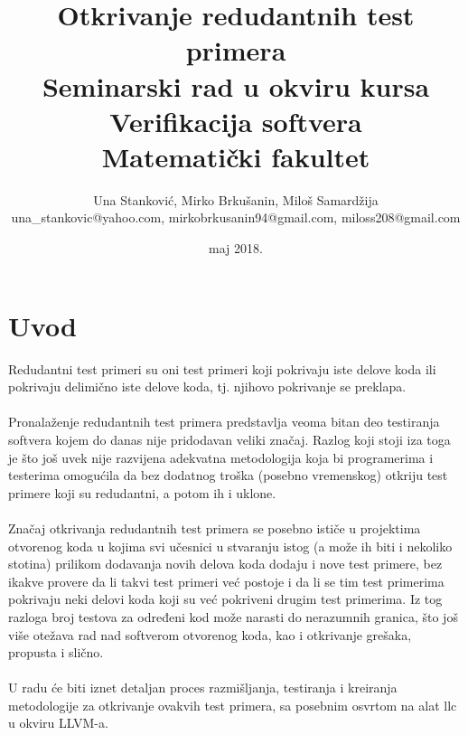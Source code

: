 \documentclass[a4paper]{article}
\begin{document}
\title{Otkrivanje redudantnih test primera\\ \small{Seminarski rad u okviru kursa\\Verifikacija softvera\\ Matematički fakultet}}

\author{Una Stanković, Mirko Brkušanin, Miloš Samardžija\\ una\_stankovic@yahoo.com, mirkobrkusanin94@gmail.com, miloss208@gmail.com}
\date{maj 2018.}
\maketitle


\tableofcontents
 
\newpage

\section{Uvod}
\label{sec:introduction}
Redudantni test primeri su oni test primeri koji pokrivaju iste delove koda ili pokrivaju delimično iste delove koda, tj. njihovo pokrivanje se preklapa.\\\\
Pronalaženje redudantnih test primera predstavlja veoma bitan deo testiranja softvera kojem do danas nije pridodavan veliki značaj. Razlog koji stoji iza toga je što još uvek nije razvijena adekvatna metodologija koja bi programerima i testerima omogućila da bez dodatnog troška (posebno vremenskog) otkriju test primere koji su redudantni, a potom ih i uklone.\\\\
Značaj otkrivanja redudantnih test primera se posebno ističe u projektima otvorenog koda u kojima svi učesnici u stvaranju istog (a može ih biti i nekoliko stotina) prilikom dodavanja novih delova koda dodaju i nove test primere, bez ikakve provere da li takvi test primeri već postoje i da li se tim test primerima pokrivaju neki delovi koda koji su već pokriveni drugim test primerima. Iz tog razloga broj testova za određeni kod može narasti do nerazumnih granica, što još više otežava rad nad softverom otvorenog koda, kao i otkrivanje grešaka, propusta i slično. \\\\
U radu će biti iznet detaljan proces razmišljanja, testiranja i kreiranja metodologije za otkrivanje ovakvih test primera, sa posebnim osvrtom na alat llc u okviru LLVM-a. 
\end{document}
